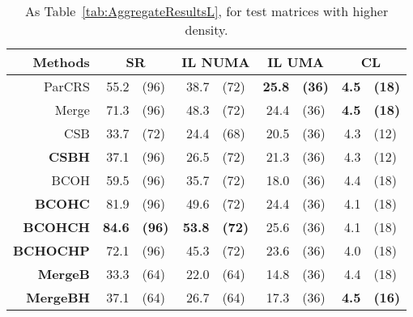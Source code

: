 \begin{table}
    \centering
    \small
    \caption{As Table~\ref{tab:AggregateResultsL}, for test matrices with higher density.}\label{tab:AggregateResultsH}
    \begin{tabular}{r r@{ }l r@{ }l r@{ }l r@{ }l}
        Methods & \multicolumn{2}{c}{SR} & \multicolumn{2}{c}{IL NUMA} & \multicolumn{2}{c}{IL UMA} & \multicolumn{2}{c}{CL}\\
        \midrule
        ParCRS           & 55.2          & (96)          & 38.7          & (72)          & \textbf{25.8} & \textbf{(36)} & \textbf{4.5} & \textbf{(18)}\\
        Merge            & 71.3          & (96)          & 48.3          & (72)          & 24.4          & (36)          & \textbf{4.5} & \textbf{(18)}\\
        CSB              & 33.7          & (72)          & 24.4          & (68)          & 20.5          & (36)          & 4.3          & (12)\\
        \textbf{CSBH}    & 37.1          & (96)          & 26.5          & (72)          & 21.3          & (36)          & 4.3          & (12)\\
        BCOH             & 59.5          & (96)          & 35.7          & (72)          & 18.0          & (36)          & 4.4          & (18)\\
        \textbf{BCOHC}   & 81.9          & (96)          & 49.6          & (72)          & 24.4          & (36)          & 4.1          & (18)\\
        \textbf{BCOHCH}  & \textbf{84.6} & \textbf{(96)} & \textbf{53.8} & \textbf{(72)} & 25.6          & (36)          & 4.1          & (18)\\
        \textbf{BCHOCHP} & 72.1          & (96)          & 45.3          & (72)          & 23.6          & (36)          & 4.0          & (18)\\
        \textbf{MergeB}  & 33.3          & (64)          & 22.0          & (64)          & 14.8          & (36)          & 4.4          & (18)\\
        \textbf{MergeBH} & 37.1          & (64)          & 26.7          & (64)          & 17.3          & (36)          & \textbf{4.5} & \textbf{(16)}\\
        \end{tabular}
\end{table}